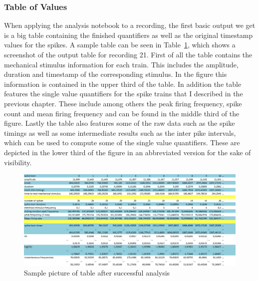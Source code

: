 \subsubsection{Table of Values}
When applying the analysis notebook to a recording, the first basic output we get is a big table containing the finished quantifiers as well as the original timestamp values for the spikes. A sample table can be seen in Table~\ref{fig:table_sc}, which shows a screenshot of the output table for recording 21.
First of all the table contains the mechanical stimulus information for each train. This includes the amplitude, duration and timestamp of the corresponding stimulus. In the figure this information is contained in the upper third of the table.
In addition the table features the single value quantifiers for the spike trains that I described in the previous chapter. These include among others the peak firing frequency, spike count and mean firing frequency and can be found in the middle third of the figure.
Lastly the table also features some of the raw data such as the spike timings as well as some intermediate results such as the inter pike intervals, which can be used to compute some of the single value quantifiers. These are depicted in the lower third of the figure in an abbreviated version for the sake of visibility.\\
\begin{figure}
	\includegraphics[width = \textwidth]{src/pic/sc_table}
	\caption{Sample picture of table after successful analysis }
	\label{fig:table_sc}
\end{figure}




